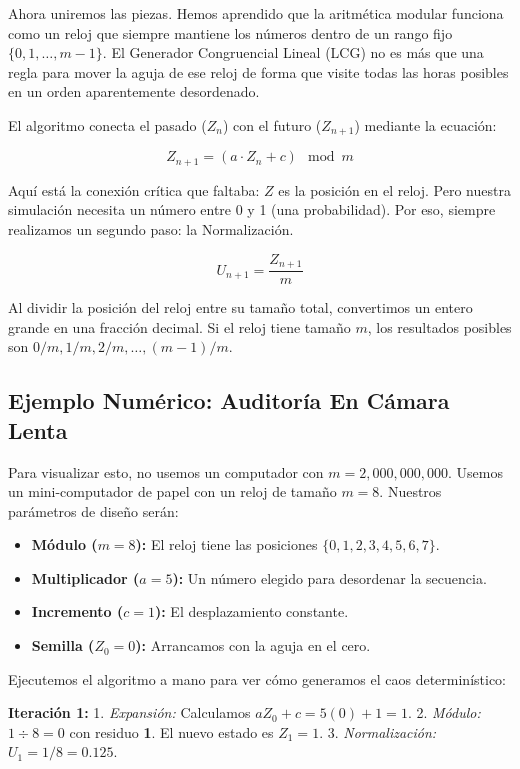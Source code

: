 \documentclass[11pt, letterpaper]{article}
\begin{document}
Ahora uniremos las piezas. Hemos aprendido que la aritmética modular funciona como un reloj que siempre mantiene los números dentro de un rango fijo $\{0, 1, \dots, m-1\}$. El Generador Congruencial Lineal (LCG) no es más que una regla para mover la aguja de ese reloj de forma que visite todas las horas posibles en un orden aparentemente desordenado.

El algoritmo conecta el pasado ($Z_n$) con el futuro ($Z_{n+1}$) mediante la ecuación:

$$ Z_{n+1} = (a \cdot Z_n + c) \mod m $$

Aquí está la conexión crítica que faltaba: $Z$ es la posición en el reloj. Pero nuestra simulación necesita un número entre 0 y 1 (una probabilidad). Por eso, siempre realizamos un segundo paso: la Normalización.

$$ U_{n+1} = \frac{Z_{n+1}}{m} $$

Al dividir la posición del reloj entre su tamaño total, convertimos un entero grande en una fracción decimal. Si el reloj tiene tamaño $m$, los resultados posibles son $0/m, 1/m, 2/m, \dots, (m-1)/m$.

\subsection{Ejemplo Numérico: Auditoría En Cámara Lenta}

Para visualizar esto, no usemos un computador con $m=2,000,000,000$. Usemos un mini-computador de papel con un reloj de tamaño $m=8$.
Nuestros parámetros de diseño serán:
\begin{itemize}
    \item \textbf{Módulo ($m=8$):} El reloj tiene las posiciones $\{0, 1, 2, 3, 4, 5, 6, 7\}$.
    \item \textbf{Multiplicador ($a=5$):} Un número elegido para desordenar la secuencia.
    \item \textbf{Incremento ($c=1$):} El desplazamiento constante.
    \item \textbf{Semilla ($Z_0=0$):} Arrancamos con la aguja en el cero.
\end{itemize}

Ejecutemos el algoritmo a mano para ver cómo generamos el caos determinístico:

\textbf{Iteración 1:}
1. \textit{Expansión:} Calculamos $aZ_0 + c = 5(0) + 1 = 1$.
2. \textit{Módulo:} $1 \div 8 = 0$ con residuo \textbf{1}. El nuevo estado es $Z_1 = 1$.
3. \textit{Normalización:} $U_1 = 1 / 8 = \mathbf{0.125}$.
\end{document}
